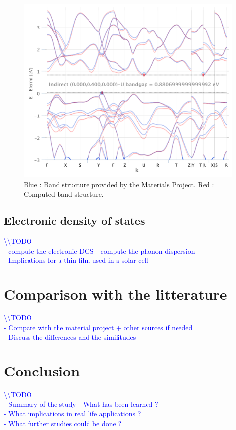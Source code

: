 \documentclass[11pt,a4paper]{article}
\begin{document}
\begin{figure}
\centering
\includegraphics[width=\textwidth]{images/bsCombined.pdf}
\caption{Blue : Band structure provided by the Materials Project. Red : Computed band structure.}
\label{fig:bsMPCombined}
\end{figure}
\subsection{Electronic density of states}

\textcolor{blue}{
\textbackslash\textbackslash TODO\\
- compute the electronic DOS 
- compute the phonon dispersion\\
- Implications for a thin film used in a solar cell}
\newpage
\section{Comparison with the litterature}
\textcolor{blue}{
\textbackslash\textbackslash TODO\\
- Compare with the material project + other sources if needed\\
- Discuss the differences and the similitudes}
\newpage
\section{Conclusion}
\textcolor{blue}{
\textbackslash\textbackslash TODO\\
- Summary of the study
- What has been learned ? \\
- What implications in real life applications ?\\
- What further studies could be done ?}


\newpage
\appendix
\end{document}

